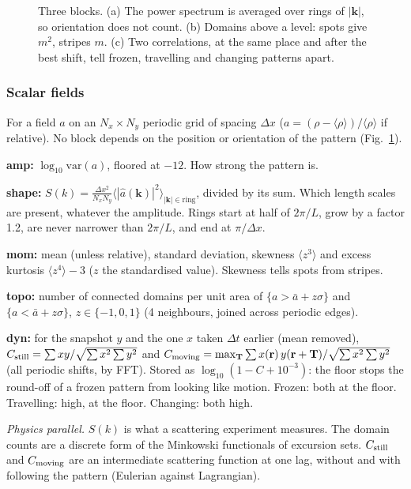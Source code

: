 \documentclass[11pt,a4paper]{article}
\newcommand{\code}[1]{\texttt{\detokenize{#1}}}
\newcommand{\avg}[1]{\langle #1 \rangle}
\begin{document}
\begin{figure}[H]
\centering

\caption{Three blocks. (a) The power spectrum is averaged over rings of $|\mathbf k|$, so orientation does
not count. (b) Domains above a level: spots give $m^2$, stripes $m$. (c) Two correlations, at the same place
and after the best shift, tell frozen, travelling and changing patterns apart.}\label{fig:descriptors}
\end{figure}

\subsubsection{Scalar fields}\label{sec:scalar}

\begin{tech}
For a field $a$ on an $N_x\times N_y$ periodic grid of spacing $\Delta x$ ($a=(\rho-\avg\rho)/\avg\rho$ if
relative). No block depends on the position or orientation of the pattern (Fig.~\ref{fig:descriptors}).

\textbf{amp:} $\log_{10}\mathrm{var}(a)$, floored at $-12$. How strong the pattern is.

\textbf{shape:} $S(k)=\frac{\Delta x^2}{N_xN_y}\avg{|\hat a(\mathbf k)|^2}_{|\mathbf k|\in\text{ring}}$, divided
by its sum. Which length scales are present, whatever the amplitude. Rings start at half of $2\pi/L$,
grow by a factor 1.2, are never narrower than $2\pi/L$, and end at $\pi/\Delta x$.

\textbf{mom:} mean (unless relative), standard deviation, skewness $\avg{z^3}$ and excess kurtosis
$\avg{z^4}-3$ ($z$ the standardised value). Skewness tells spots from stripes.

\textbf{topo:} number of connected domains per unit area of $\{a>\bar a+z\sigma\}$ and
$\{a<\bar a+z\sigma\}$, $z\in\{-1,0,1\}$ (4 neighbours, joined across periodic edges).

\textbf{dyn:} for the snapshot $y$ and the one $x$ taken $\Delta t$ earlier (mean removed),
$C_{\rm still}=\sum xy/\sqrt{\sum x^2\sum y^2}$ and
$C_{\rm moving}=\max_{\mathbf T}\sum x(\mathbf r)\,y(\mathbf r+\mathbf T)/\sqrt{\sum x^2\sum y^2}$ (all periodic
shifts, by FFT). Stored as $\log_{10}(1-C+10^{-3})$: the floor stops the round-off of a frozen pattern
from looking like motion. Frozen: both at the floor. Travelling: \code{still} high, \code{moving} at the
floor. Changing: both high.

\emph{Physics parallel.} $S(k)$ is what a scattering experiment measures. The domain counts are a discrete
form of the Minkowski functionals of excursion sets. $C_{\rm still}$ and $C_{\rm moving}$ are an intermediate
scattering function at one lag, without and with following the pattern (Eulerian against Lagrangian).
\end{tech}
\end{document}
